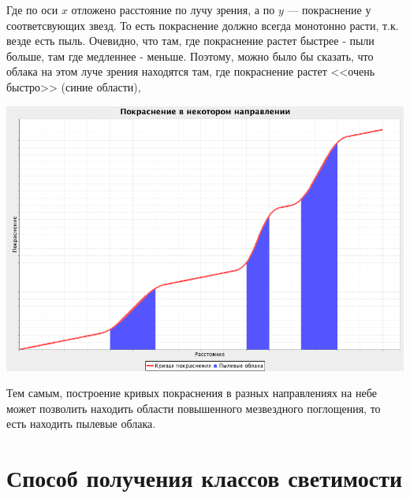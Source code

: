 \documentclass[14pt]{article}
\begin{document}
        		Где по оси $x$ отложено расстояние по лучу зрения, а по $y$ --- покраснение у соответсвующих звезд. То есть покраснение должно всегда монотонно расти, т.к. везде есть пыль.  Очевидно, что там, где покраснение растет быстрее - пыли больше, там где медленнее - меньше. Поэтому, можно было бы сказать, что облака на этом луче зрения находятся там, где покраснение растет <<очень быстро>> (синие области),   
           
            \begin{center}
           		\includegraphics[scale=0.3]{../../presentation/ideal-2-no-tick.png}    
			\end{center}        
        
        		Тем самым, построение кривых покраснения в разных направлениях на небе может позволить находить области повышенного мезвездного поглощения, то есть находить пылевые облака. 
			        
        
        
        
        
        
	\section{Способ получения классов светимости}
	
\end{document}
